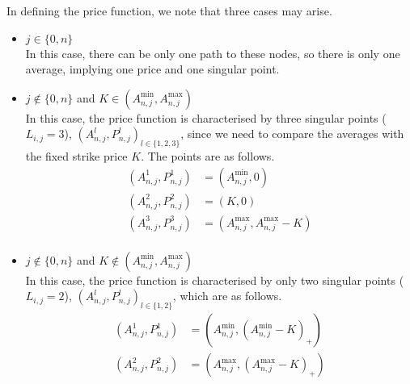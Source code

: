 In defining the price function, we note that three cases may arise.
\begin{itemize}
\item $ j \in \{ 0, n \} $ \\
	In this case, there can be only one path to these nodes, so there is only one average, implying one price and one singular point.
	
\item $ j \notin \{ 0, n \} $ and $ K \in ( A_{n,j}^{\min}, A_{n,j}^{\max} ) $ \\	
	In this case, the price function is characterised by three singular points ($ L_{i,j} = 3 $), $ ( A_{n,j}^l , P_{n,j}^l )_{l \in \{ 1, 2, 3 \} } $, since we need to compare the averages with the fixed strike price $ K $. The points are as follows.  \\
	\begin{equation}
		\label{eq:asian-price-maturity-kin}
		\begin{aligned}
			( A_{n,j}^1 , P_{n,j}^1 ) &= ( A_{n,j}^{\min} , 0 ) \\
			( A_{n,j}^2 , P_{n,j}^2 ) &= ( K , 0 ) \\
			( A_{n,j}^3 , P_{n,j}^3 ) &= ( A_{n,j}^{\max} , A_{n,j}^{\max} - K ) \\
		\end{aligned}
	\end{equation} \label{eq:asian-price-maturity-kout}
	
\item $ j \notin \{ 0, n \} $ and $ K \notin ( A_{n,j}^{\min}, A_{n,j}^{\max} ) $ \\
	In this case, the price function is characterised by only two singular points ($ L_{i,j} = 2 $), $ ( A_{n,j}^l , P_{n,j}^l )_{l \in \{ 1, 2 \} } $, which are as follows. \\
	\begin{equation}
		\label{eq:asian-price-maturity-knotin}
		\begin{aligned}
			( A_{n,j}^1 , P_{n,j}^1 ) &= ( A_{n,j}^{\min} , ( A_{n,j}^{\min} - K )_+ ) \\
			( A_{n,j}^2 , P_{n,j}^2 ) &= ( A_{n,j}^{\max} , ( A_{n,j}^{\max} - K )_+ ) \\
		\end{aligned}
	\end{equation}
\end{itemize}

